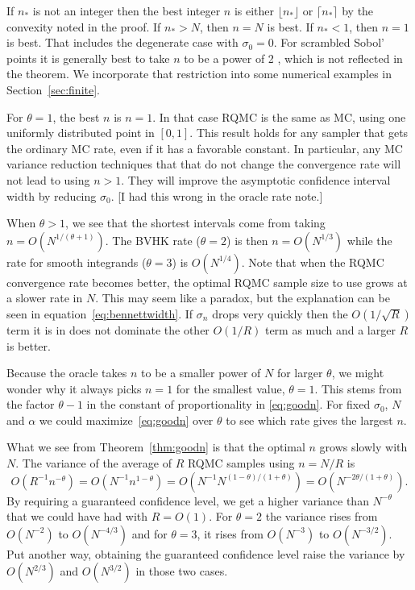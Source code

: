 \documentclass{article}
\newcommand{\art}[1]{\begingroup\color{blue}#1\endgroup}
\begin{document}
If $n_*$ is not an integer then the
best integer $n$ is either $\lfloor n_*\rfloor$
or $\lceil n_*\rceil$ by the convexity noted in the proof.
If $n_*>N$, then $n=N$ is best. If $n_*<1$, then $n=1$ is best.
That includes the degenerate case with $\sigma_0=0$.
For scrambled Sobol' points it is generally best to
take $n$ to be a power of 2 \cite{Owe22a}, which is not
reflected in the theorem.  We incorporate that restriction
into some numerical examples in Section~\ref{sec:finite}.

For $\theta = 1$, the best $n$ is $n=1$. In that case RQMC is the same as MC, using one uniformly distributed point in $[0,1]$. This result holds for any sampler that gets the ordinary MC rate, even if it has a favorable constant.  In particular, any MC variance reduction techniques that that do not change the convergence rate will not lead to using $n>1$.  They will improve the asymptotic confidence interval width by reducing $\sigma_0$.  \art{[I had this wrong in the oracle rate note.]}

When $\theta>1$, we see that the shortest intervals
come from taking $n = O(N^{1/(\theta+1)})$.
The BVHK rate ($\theta=2$) is then $n=O(N^{1/3})$ while the
rate for smooth integrands ($\theta=3$) is $O(N^{1/4})$.
Note that when the RQMC convergence rate becomes better,
the optimal RQMC sample size to use grows at a slower
rate in $N$.  This may seem like a paradox, but the explanation
can be seen in equation~\eqref{eq:bennettwidth}.
If $\sigma_n$ drops very quickly then the $O(1/\sqrt{R})$ term
it is in does not dominate the other $O(1/R)$ term as much
and a larger $R$ is better.

Because the oracle takes $n$ to be a smaller
power of $N$ for larger $\theta$, we might
wonder why it always picks $n=1$ for the smallest value, $\theta=1$. 
This stems from the factor $\theta-1$ in the constant of proportionality
in \eqref{eq:goodn}.
For fixed $\sigma_0$, $N$ and $\alpha$ we could 
maximize~\eqref{eq:goodn} over $\theta$
to see which rate gives the largest $n$.

What we see from Theorem~\ref{thm:goodn} is that the optimal
$n$ grows slowly with $N$. The variance of the average of $R$
RQMC samples using $n=N/R$ is
$$
O(R^{-1}n^{-\theta}) = O( N^{-1}n^{1-\theta})
= O( N^{-1}N^{(1-\theta)/(1+\theta)})
= O( N^{-2\theta/(1+\theta)}).
$$
By requiring a guaranteed confidence level, we
get a higher variance than $N^{-\theta}$
that we could have had with $R=O(1)$.
For $\theta=2$ the variance rises
from $O(N^{-2})$ to $O(N^{-4/3})$
and for $\theta=3$, it rises from
$O(N^{-3})$ to $O(N^{-3/2})$.
Put another way, obtaining the guaranteed confidence
level raise the variance by $O(N^{2/3})$
and $O(N^{3/2})$ in those two cases.
\end{document}
